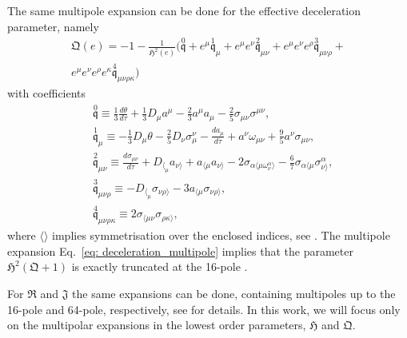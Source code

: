 \documentclass[fleqn,usenatbib]{mnras}
\begin{document}
The same {multipole expansion} can be done for the {effective} deceleration parameter, {namely}
\begin{multline}
    \mathfrak{Q}(e) = -1 - \frac{1}{\mathfrak{H}^2(e)} \bigg( \overset{0}{\mathfrak{q}}+e^\mu \overset{1}{\mathfrak{q}}_\mu + e^\mu e^\nu\overset{2}{\mathfrak{q}}_{\mu\nu}+ 
    e^\mu e^\nu e^\rho \overset{3}{\mathfrak{q}}_{\mu\nu\rho} +\\
e^\mu e^\nu e^\rho e^\kappa \overset{4}{\mathfrak{q}}_{\mu\nu\rho\kappa}\bigg)
     \label{eq: deceleration_multipole}  
\end{multline}
with coefficients
\begin{subequations} \label{eqs:q_coeffs}
    \begin{align}
     &\overset{0}{\mathfrak{q}} \equiv \frac{1}{3} \frac{d\theta}{d\tau} + \frac{1}{3}D_\mu a^{\mu} - \frac{2}{3}a^\mu a_\mu - \frac{2}{5} \sigma_{\mu\nu}\sigma^{\mu\nu}, \\
     &\overset{1}{\mathfrak{q}}_\mu \equiv - \frac{1}{3}D_\mu \theta  - \frac{2}{5} D_\nu \sigma^\nu_{\mu} -\frac{da_\mu}{d\tau}+a^\nu \omega_{\mu\nu}+ \frac{9}{5}a^\nu \sigma_{\mu\nu} \label{eq:q1_coefficent},  \\
      &\overset{2}{\mathfrak{q}}_{\mu\nu} \equiv \frac{d\sigma_{\mu\nu}}{d\tau} + D_{\langle _\mu}a_{\nu\rangle} + a_{\langle \mu }a_{\nu \rangle } -2\sigma_{\alpha\langle\mu \omega^\alpha_\nu\rangle} -\frac{6}{7}\sigma_{\alpha \langle \mu }\sigma^\alpha_{\nu \rangle }, \\
       &\overset{3}{\mathfrak{q}}_{\mu\nu\rho} \equiv  - D_{\langle _\mu}\sigma_{\nu\rho\rangle} -3a_{\langle \mu }\sigma_{\nu\rho \rangle } ,\label{eq:q3_coefficent}
       \\
    &\overset{4}{\mathfrak{q}}_{\mu\nu\rho\kappa} \equiv  2\sigma_{\langle \mu\nu }\sigma_{\rho\kappa \rangle },
    \end{align}
\end{subequations}
where $\langle\rangle$ implies symmetrisation over the enclosed indices, see \citet{Heinesen_2021}. {The multipole expansion Eq.~\eqref{eq: deceleration_multipole} implies that the parameter $\mathfrak{H}^2(\mathfrak{Q}+1)$ is exactly truncated at the 16-pole \citep[see][]{Heinesen_2021}. }

For $\mathfrak{R}$ and $\mathfrak{J}$ the same {expansions} can be done, %
{containing multipoles} up to {the} 16-pole and  %
64-pole, {respectively,} see \citet{Heinesen_2021} for details.
{In this work, we will focus only on the multipolar expansions in the lowest order parameters, $\mathfrak{H}$ and $\mathfrak{Q}$.}
\end{document}
